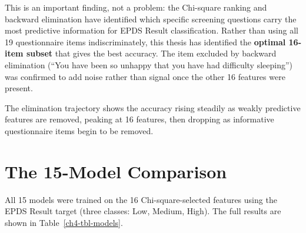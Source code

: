 This is an important finding, not a problem: the Chi-square ranking and backward elimination have identified which specific screening questions carry the most predictive information for EPDS Result classification.
Rather than using all 19 questionnaire items indiscriminately, this thesis has identified the \textbf{optimal 16-item subset} that gives the best accuracy.
The item excluded by backward elimination (``You have been so unhappy that you have had difficulty sleeping'') was confirmed to add noise rather than signal once the other 16 features were present.

The elimination trajectory shows the accuracy rising steadily as weakly predictive features are removed, peaking at 16 features, then dropping as informative questionnaire items begin to be removed.

\section{The 15-Model Comparison}
\label{ch4-sec-models}

All 15 models were trained on the 16 Chi-square-selected features using the EPDS Result target (three classes: Low, Medium, High).
The full results are shown in Table~\ref{ch4-tbl-models}.


